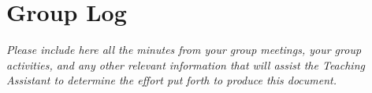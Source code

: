 
\section{Group Log}
    \emph{Please include here all the minutes from your group meetings, your group activities, and any other relevant information that will assist the Teaching Assistant to determine the effort put forth to produce this document.}

